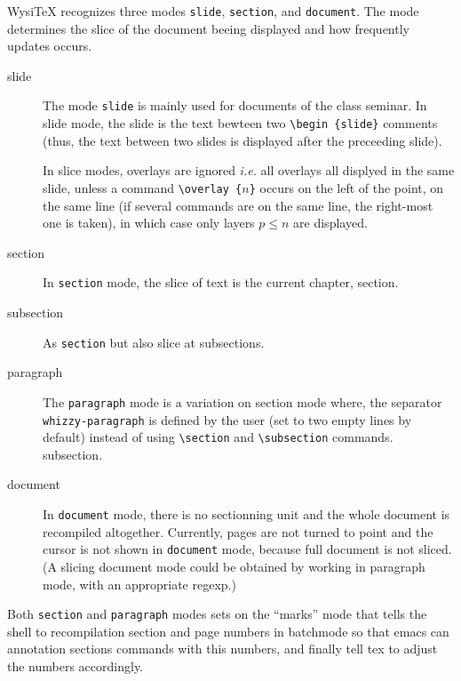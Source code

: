 \documentclass{article}
\let \lst \verb
\begin{document}
WysiTeX recognizes three modes \lst"slide", \lst"section", and \lst"document". 
The mode determines the slice of the document beeing displayed and how
frequently updates occurs. 
\begin{description}

\item [slide]

The mode \lst"slide"  is mainly used for documents of the class seminar. 
In slide mode, the slide is the text bewteen two \lst"\begin {slide}"
comments (thus,  the text between two slides is displayed after the
preceeding slide).  

In slice modes, overlays are ignored {\em i.e.} all overlays all displyed in
the same slide, unless a command
\lst"\overlay {"$n$\lst"}" occurs on the left of the point, on the same line
(if several commands are on the same line, the 
right-most one is taken), in which case only layers $p \le n$ are displayed.

\item [section]
In \lst"section" mode, the slice of text is the current chapter, section.

\item [subsection]
As \lst"section" but also slice at subsections. 

\item [paragraph]
The \lst"paragraph" mode is a variation on section mode where, the separator
\lst"whizzy-paragraph" is defined by the user (set to two empty lines by
default) instead of using \lst"\section"  and \lst"\subsection" commands. 
subsection.

\item [document]
In \lst"document" mode, there is no sectionning unit and the whole document is
recompiled altogether. Currently, pages are not turned to point and the 
cursor is not shown in \lst"document" mode, because full document is not
sliced. (A slicing document mode could be obtained by working in paragraph
mode, with an appropriate regexp.)


\end{description}
Both \lst"section" and \lst"paragraph" modes sets on the ``marks'' mode
that tells the shell to recompilation section and page numbers in batchmode
so that emacs can annotation sections commands with this numbers, and
finally tell tex to adjust the numbers accordingly.
\end{document}
